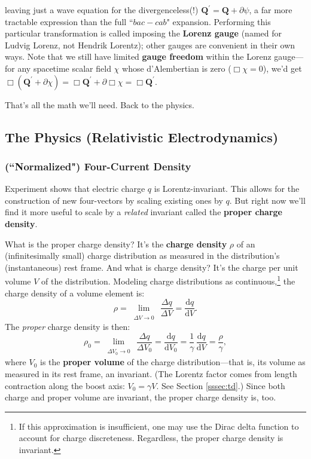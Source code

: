 \documentclass[12pt]{article}
\renewcommand{\vv}[1]{\mathbf{#1}}
\newcommand{\dd}[1]{\mathrm{d}#1}
\begin{document}
leaving just a wave equation for the divergenceless(!) $\vv Q^\prime = \vv Q + \partialup \psi$, a far more tractable expression than the full ``$bac - cab$" expansion. Performing this particular transformation is called imposing the \textbf{Lorenz gauge} (named for Ludvig Lorenz, not Hendrik Lorentz); other gauges are convenient in their own ways. Note that we still have limited \textbf{gauge freedom} within the Lorenz gauge---for any spacetime scalar field $\chi$ whose d'Alembertian is zero (${\Box \chi = 0}$), we'd get $\Box ( \vv Q^\prime + \partialup \chi ) = \Box \vv Q^\prime + \partialup \Box \chi = \Box \vv Q^\prime$.

That's all the math we'll need. Back to the physics.



\subsection{The Physics (Relativistic Electrodynamics)}

\subsubsection[("Normalized") Four-Current Density]{(``Normalized") Four-Current Density}

Experiment shows that electric charge $q$ is Lorentz-invariant. This allows for the construction of new four-vectors by scaling existing ones by $q$. But right now we'll find it more useful to scale by a \emph{related} invariant called the \textbf{proper charge density}.

What is the proper charge density? It's the \textbf{charge density} $\rho$ of an (infinitesimally small) charge distribution as measured in the distribution's (instantaneous) rest frame. And what is charge density? It's the charge per unit volume $V$ of the distribution. Modeling charge distributions as continuous,\footnote{If this approximation is insufficient, one may use the Dirac delta function to account for charge discreteness. Regardless, the proper charge density is invariant.} the charge density of a volume element is:
\begin{equation*}
\rho = \lim\limits_{\substack{\\ \Delta V \to 0}} \, \dfrac{\Delta q}{\Delta V} = \dfrac{\dd q}{\dd V} .
\end{equation*}
The \emph{proper} charge density is then:
\begin{equation*}
\rho_0 = \lim\limits_{\substack{\\ \Delta V_0 \to 0}} \, \dfrac{\Delta q}{\Delta V_0} = \dfrac{\dd q}{\dd V_0} = \dfrac{1}{\gamma} \, \dfrac{\dd q}{\dd V} = \dfrac{\rho}{\gamma},
\end{equation*}
where $V_0$ is the \textbf{proper volume} of the charge distribution---that is, its volume as measured in its rest frame, an invariant. (The Lorentz factor comes from length contraction along the boost axis: $V_0 = \gamma V$. See Section \ref{sssec:td}.) Since both charge and proper volume are invariant, the proper charge density is, too.
\end{document}
